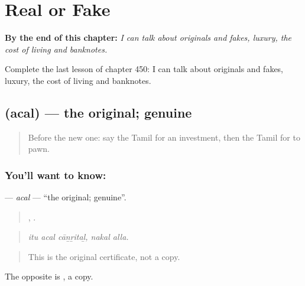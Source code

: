 
\chapter{Real or Fake}
\label{ch:ta-real-or-fake}

\begin{chapteropening}
\textbf{By the end of this chapter:} \emph{I can talk about originals and fakes, luxury, the cost of living and banknotes.}

Complete the last lesson of chapter 450: I can talk about originals and fakes, luxury, the cost of living and banknotes.
\end{chapteropening}

\section[\texorpdfstring{\ta{அசல்} (acal)}{அசல் (acal)}]{ (acal) — the original; genuine}

\label{lesson:TA-C450-acal}



\begin{quote}
Before the new one: say the Tamil for an investment, then the Tamil for to pawn.
\end{quote}

\subsection*{You'll want to know: }
\textbf{} — \emph{acal} — \textquotedblleft{}the original; genuine\textquotedblright{}.

\begin{quote}
  ,  .
\end{quote}

\begin{quote}
\emph{itu acal cāṉṟitaḻ, nakal alla.}
\end{quote}

\begin{quote}
This is the original certificate, not a copy.
\end{quote}

The opposite is , a copy.

